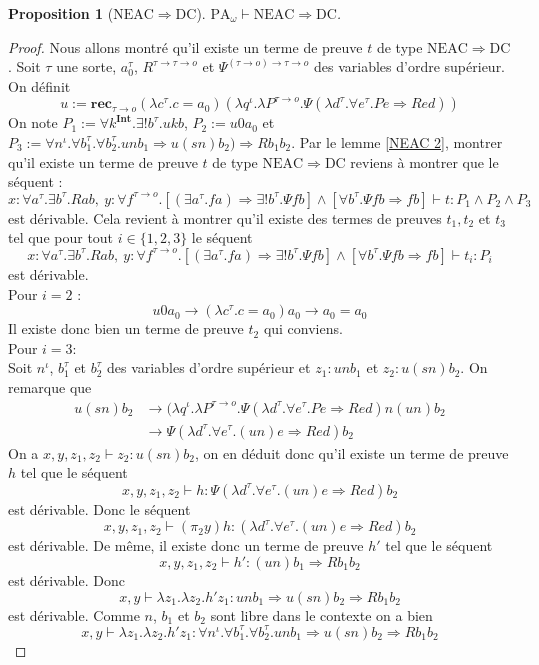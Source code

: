 \documentclass[a4paper,12pt]{article}
\newtheorem{prop}[theo]{Proposition}
\theoremstyle{rmqstyle}
\newcommand{\set}[1]{\{#1\}}
\newcommand{\PA}{\mathrm{PA}}
\renewcommand{\int}{\mathbf{Int}}
\newcommand{\rec}{\mathbf{rec}}
\renewcommand{\implies}{\Rightarrow}
\newcommand{\NEAC}{\mathrm{NEAC}}
\newcommand{\DC}{\mathrm{DC}}
\begin{document}
\begin{prop}[$\NEAC \implies \DC$]
$\PA_\omega \vdash \NEAC \implies \DC$.
\end{prop}

\begin{proof}
Nous allons montré qu'il existe un terme de preuve $t$ de type $\NEAC \implies \DC$. Soit $\tau$ une sorte, $a_0^\tau$, $R^{\tau \to \tau \to o}$ et $\Psi^{(\tau \to o) \to \tau \to o}$ des variables d'ordre supérieur. On définit 
$$ u := \rec_{\tau \to o} (\lambda c^\tau. c = a_0) (\lambda q^\iota. \lambda P^{\tau \to o}. \Psi (\lambda d^\tau. \forall e^\tau. P e \implies Red))$$
On note $P_1 := \forall k^\int. \exists ! b^\tau. ukb$, $P_2:= u 0 a_0$ et $P_3 := \forall n^\iota. \forall b_1^\tau. \forall b_2^\tau. u n b_1 \implies u (sn) b_2)\implies R b_1 b_2$. Par le lemme \ref{NEAC 2}, montrer qu'il existe un terme de preuve $t$ de type $\NEAC \implies \DC$ reviens à montrer que le séquent :
$$ x : \forall a^\tau. \exists b^\tau. R a b, \ y : \forall f^{\tau \to o}.[( \exists a^\tau. fa) \implies \exists ! b^\tau.\Psi f b] \land [\forall b^\tau. \Psi f b \implies fb] \vdash t : P_1 \land P_2 \land P_3$$
est dérivable. Cela revient à montrer qu'il existe des termes de preuves $t_1, t_2$ et $t_3$ tel que pour tout $i \in \set{1,2,3}$ le séquent 
$$x : \forall a^\tau. \exists b^\tau. R a b, \ y : \forall f^{\tau \to o}.[( \exists a^\tau. fa) \implies \exists ! b^\tau.\Psi f b] \land [\forall b^\tau. \Psi f b \implies fb] \vdash t_i: P_i $$
est dérivable.\\

Pour $i = 2$ :\\
$$u 0 a_0 \longrightarrow (\lambda c^\tau. c = a_0) a_0 \longrightarrow a_0 = a_0$$
Il existe donc bien un terme de preuve $t_2$ qui conviens.\\

Pour $i = 3$:\\
Soit $n^\iota$, $b_1^\tau$ et $b_2^\tau$ des variables d'ordre supérieur et $z_1 : u n b_1$ et $z_2 : u (sn) b_2$.  On remarque que 
\begin{align*}
u (sn) b_2 &\longrightarrow (\lambda q^\iota. \lambda P^{\tau \to o}. \Psi (\lambda d^\tau. \forall e^\tau. P e \implies Red) n (u n) b_2\\
&\longrightarrow \Psi (\lambda d^\tau. \forall e^\tau. (un) e \implies Red) b_2
\end{align*}
On a  $x,y,z_1,z_2 \vdash z_2 : u (sn) b_2$, on en déduit donc qu'il existe un terme de preuve $h$ tel que le séquent
$$x,y,z_1,z_2 \vdash h: \Psi (\lambda d^\tau. \forall e^\tau. (un) e \implies Red) b_2$$
est dérivable. Donc le séquent 
$$x,y,z_1,z_2 \vdash (\pi_2 y) h: (\lambda d^\tau. \forall e^\tau. (un) e \implies Red) b_2$$
est dérivable. De même, il existe donc un terme de preuve $h'$ tel que le séquent
$$x,y,z_1,z_2 \vdash h': (un) b_1 \implies Rb_1b_2$$
est dérivable. Donc
$$x,y \vdash \lambda z_1. \lambda z_2. h'z_1: unb_1 \implies u(sn)b_2\implies Rb_1b_2$$
est dérivable. Comme $n$, $b_1$ et $b_2$ sont libre dans le contexte on a bien 
$$x,y \vdash \lambda z_1. \lambda z_2. h'z_1: \forall n^\iota. \forall b_1^\tau. \forall b_2^\tau. u n b_1 \implies u (sn) b_2 \implies Rb_1 b_2$$


\end{proof}
\end{document}
